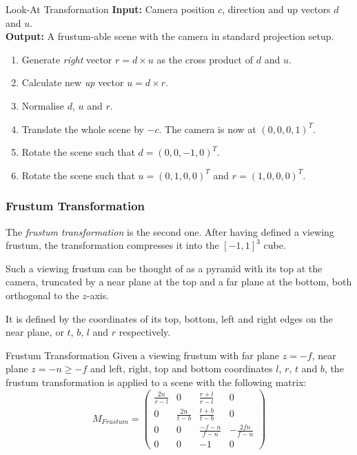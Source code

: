 \documentclass{panikzettel}
\begin{document}
\begin{algo}{Look-At Transformation}
\textbf{Input:} Camera position $c$, direction and up vectors $d$ and $u$. \\
\textbf{Output:} A frustum-able scene with the camera in standard projection setup.
\tcblower
\begin{enumerate}
    \item Generate \emph{right} vector $r = d \times u$ as the cross product of $d$ and $u$.
    \item Calculate new \emph{up} vector $u = d \times r$.
    \item Normalise $d$, $u$ and $r$.
    \item Translate the whole scene by $-c$. The camera is now at $(0, 0, 0, 1)^T$.
    \item Rotate the scene such that $d = (0, 0, -1, 0)^T$.
    \item Rotate the scene such that $u = (0, 1, 0, 0)^T$ and $r = (1, 0, 0, 0)^T$.
\end{enumerate}
\end{algo}

\subsubsection*{Frustum Transformation}

\begin{halfboxl}
The \emph{frustum transformation} is the second one. After having defined a viewing frustum, the transformation compresses it into the $[-1,1]^3$ cube.

Such a viewing frustum can be thought of as a pyramid with its top at the camera, truncated by a near plane at the top and a far plane at the bottom, both orthogonal to the $z$-axis.

It is defined by the coordinates of its top, bottom, left and right edges on the near plane, or $t$, $b$, $l$ and $r$ respectively.

\end{halfboxl}%
\begin{halfboxr}
\vspace{-\baselineskip}
\begin{defi}{Frustum Transformation}
Given a viewing frustum with far plane $z = -f$, near plane $z = -n \ge -f$ and left, right, top and bottom coordinates $l$, $r$, $t$ and $b$, the frustum transformation is applied to a scene with the following matrix:
$$M_{Frustum} = \begin{pmatrix}
\frac{2n}{r-l} & 0 & \frac{r+l}{r-l} & 0 \\
0 & \frac{2n}{t-b} & \frac{t+b}{t-b} & 0 \\
0 & 0 & \frac{-f-n}{f-n} & -\frac{2fn}{f-n} \\
0 & 0 & -1 & 0
\end{pmatrix}$$
\end{defi}
\end{halfboxr}
\end{document}
